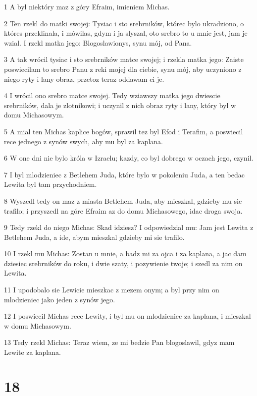\par 1 A byl niektóry maz z góry Efraim, imieniem Michas.
\par 2 Ten rzekl do matki swojej: Tysiac i sto srebrników, którec bylo ukradziono, o któres przeklinala, i mówilas, gdym i ja slyszal, oto srebro to u mnie jest, jam je wzial. I rzekl matka jego: Blogoslawionys, synu mój, od Pana.
\par 3 A tak wrócil tysiac i sto srebrników matce swojej; i rzekla matka jego: Zaiste poswiecilam to srebro Panu z reki mojej dla ciebie, synu mój, aby uczyniono z niego ryty i lany obraz, przetoz teraz oddawam ci je.
\par 4 I wrócil ono srebro matce swojej. Tedy wziawszy matka jego dwiescie srebrników, dala je zlotnikowi; i uczynil z nich obraz ryty i lany, który byl w domu Michasowym.
\par 5 A mial ten Michas kaplice bogów, sprawil tez byl Efod i Terafim, a poswiecil rece jednego z synów swych, aby mu byl za kaplana.
\par 6 W one dni nie bylo króla w Izraelu; kazdy, co byl dobrego w oczach jego, czynil.
\par 7 I byl mlodzieniec z Betlehem Juda, które bylo w pokoleniu Juda, a ten bedac Lewita byl tam przychodniem.
\par 8 Wyszedl tedy on maz z miasta Betlehem Juda, aby mieszkal, gdzieby mu sie trafilo; i przyszedl na góre Efraim az do domu Michasowego, idac droga swoja.
\par 9 Tedy rzekl do niego Michas: Skad idziesz? I odpowiedzial mu: Jam jest Lewita z Betlehem Juda, a ide, abym mieszkal gdzieby mi sie trafilo.
\par 10 I rzekl mu Michas: Zostan u mnie, a badz mi za ojca i za kaplana, a jac dam dziesiec srebrników do roku, i dwie szaty, i pozywienie twoje; i szedl za nim on Lewita.
\par 11 I upodobalo sie Lewicie mieszkac z mezem onym; a byl przy nim on mlodzieniec jako jeden z synów jego.
\par 12 I poswiecil Michas rece Lewity, i byl mu on mlodzieniec za kaplana, i mieszkal w domu Michasowym.
\par 13 Tedy rzekl Michas: Teraz wiem, ze mi bedzie Pan blogoslawil, gdyz mam Lewite za kaplana.

\chapter{18}

